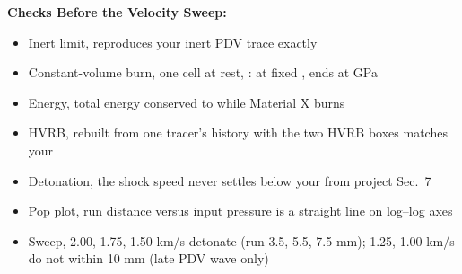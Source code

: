 \documentclass[11pt,addpoints]{exam}
\begin{document}
\begin{tcolorbox}[breakable]
\textbf{Checks Before the Velocity Sweep:}\vspace{.5em}
\begin{itemize}
\item Inert limit, \hspace{3mm}  reproduces your inert PDV trace exactly\vspace{.25em}
\item Constant-volume burn, \hspace{3mm} one cell at rest, \bm{$\lambda$}:  at fixed , \hspace{2mm} ends at  GPa\vspace{.25em}
\item Energy, \hspace{3mm} total energy conserved to  while Material X burns\vspace{.25em}
\item HVRB, \hspace{3mm} \bm{$\lambda$} rebuilt from one tracer's  history with the two HVRB boxes matches your \vspace{.25em}
\item Detonation, \hspace{3mm} the shock speed never settles below your  from project Sec.~7\vspace{.25em}
\item Pop plot, \hspace{3mm} run distance versus input pressure is a straight line on log--log axes \cite{ramsay1965}\vspace{.25em}
\item Sweep, \hspace{3mm} 2.00, 1.75, 1.50 km/s detonate (run \bm{$\approx$} 3.5, 5.5, 7.5 mm); \hspace{2mm} 1.25, 1.00 km/s do not within 10 mm (late PDV wave only)
\end{itemize}
\end{tcolorbox}


\clearpage
\end{document}
